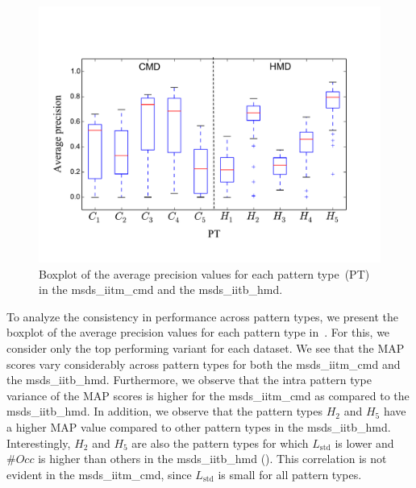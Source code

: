 \begin{figure}
	\begin{center}
		\includegraphics[width=\figSizeEightyFive]{ch06_patterns/figures/SimilarityEvaluation/CMD_HMD_CW_MAP.pdf}
	\end{center}
	\caption{Boxplot of the average precision values for each pattern type~(PT) in the \acrshort{msds_iitm_cmd} and the \acrshort{msds_iitb_hmd}.}
	\label{fig:patterns_similarity_evaluation_results_boxplot}
\end{figure}


To analyze the consistency in performance across pattern types, we present the boxplot of the average precision values for each pattern type in~. For this, we consider only the top performing variant for each dataset. We see that the MAP scores vary considerably across pattern types for both the \acrshort{msds_iitm_cmd} and the \acrshort{msds_iitb_hmd}. Furthermore, we observe that the intra pattern type variance of the MAP scores is higher for the \acrshort{msds_iitm_cmd} as compared to the \acrshort{msds_iitb_hmd}. In addition, we observe that the pattern types $H_2$ and $H_5$ have a higher MAP value compared to other pattern types in the \acrshort{msds_iitb_hmd}. Interestingly, $H_2$ and $H_5$ are also the pattern types for which $L_{\mathrm{std}}$ is lower and $\#Occ$ is higher than others in the \acrshort{msds_iitb_hmd} (). This correlation is not evident in the \acrshort{msds_iitm_cmd}, since $L_{\mathrm{std}}$ is small for all pattern types. 


